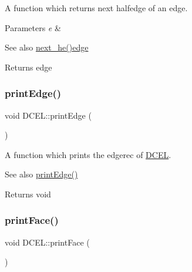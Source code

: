 A function which returns next halfedge of an edge. 


\begin{DoxyParams}{Parameters}
{\em e} & \\
\hline
\end{DoxyParams}
\begin{DoxySeeAlso}{See also}
\hyperlink{class_d_c_e_l_a384c90222cc7e6a09ba47d66e9e11df8}{next\+\_\+he()}\hyperlink{_polygon_triangulation_8h_a4ef43ff5c6d42dacbc8ffd9c8cfdc189}{edge} 
\end{DoxySeeAlso}
\begin{DoxyReturn}{Returns}
edge 
\end{DoxyReturn}
\mbox{\label{class_d_c_e_l_adbd14f5b0b02b6760ae60a2f78262aaf}} 
\subsubsection{\texorpdfstring{print\+Edge()}{printEdge()}}
{\footnotesize\ttfamily void D\+C\+E\+L\+::print\+Edge (\begin{DoxyParamCaption}{ }\end{DoxyParamCaption})\hspace{0.3cm}{\ttfamily [inline]}}



A function which prints the edgerec of \hyperlink{class_d_c_e_l}{D\+C\+EL}. 

\begin{DoxySeeAlso}{See also}
\hyperlink{class_d_c_e_l_adbd14f5b0b02b6760ae60a2f78262aaf}{print\+Edge()} 
\end{DoxySeeAlso}
\begin{DoxyReturn}{Returns}
void 
\end{DoxyReturn}
\mbox{\label{class_d_c_e_l_a02d6d3ab8652a6d7cd1bd4488bbec5de}} 
\subsubsection{\texorpdfstring{print\+Face()}{printFace()}}
{\footnotesize\ttfamily void D\+C\+E\+L\+::print\+Face (\begin{DoxyParamCaption}{ }\end{DoxyParamCaption})\hspace{0.3cm}{\ttfamily [inline]}}



